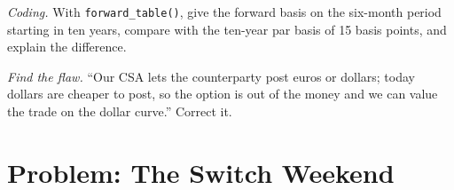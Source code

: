 \begin{exercise}[$\star\star\star$]\label{exo:rc:multi-curve-and-collateral-discounting:7}
\emph{Coding.} With \texttt{forward\_table()}, give the forward basis on the
six-month period starting in ten years, compare with the ten-year par basis of
15 basis points, and explain the difference.
\end{exercise}

\begin{exercise}[$\star\star\star$]\label{exo:rc:multi-curve-and-collateral-discounting:8}
\emph{Find the flaw.} ``Our CSA lets the counterparty post euros or dollars;
today dollars are cheaper to post, so the option is out of the money and we
can value the trade on the dollar curve.'' Correct it.
\end{exercise}

\section{Problem: The Switch Weekend}

